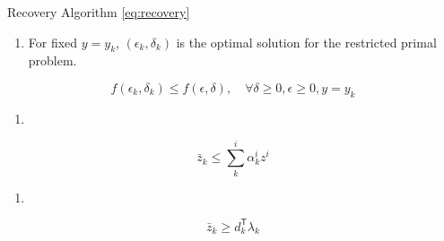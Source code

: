 \begin{theorem} \label{lemma:recovery}  Recovery Algorithm \eqref{eq:recovery}
  \begin{enumerate}
    \def\labelenumi{(\alph{enumi})}
    \tightlist
    \item
          For fixed \(y=y_k\), \((\epsilon_k, \delta_k)\) is the optimal
          solution for the restricted primal problem.
  \end{enumerate}

  \[f(\epsilon_k, \delta_k) \le f(\epsilon, \delta), \quad \forall \delta\ge 0, \epsilon\ge 0, y= y_k\]

  \begin{enumerate}
    \def\labelenumi{(\alph{enumi})}
    \setcounter{enumi}{1}
    \tightlist
    \item
  \end{enumerate}

  \[\bar z_k \le \sum^i_k \alpha^i_k z^i\]
  \begin{enumerate}
    \def\labelenumi{(\alph{enumi})}
    \setcounter{enumi}{2}
    \tightlist
    \item
  \end{enumerate}
  \[\bar z_k \ge d_k^\mathsf{T} \lambda_k\]

\end{theorem}

